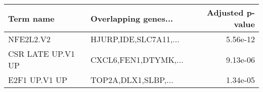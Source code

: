 \begin{tabular}{llr}
\toprule
        Term name &  Overlapping genes... &  Adjusted p-value \\
\midrule
        NFE2L2.V2 & HJURP,IDE,SLC7A11,... &          5.56e-12 \\
CSR LATE UP.V1 UP &  CXCL6,FEN1,DTYMK,... &          9.13e-06 \\
    E2F1 UP.V1 UP &   TOP2A,DLX1,SLBP,... &          1.34e-05 \\
\bottomrule
\end{tabular}
